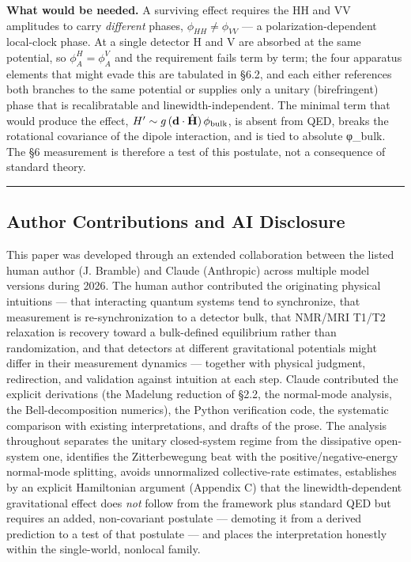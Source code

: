 \documentclass[
]{article}
\begin{document}
\textbf{What would be needed.} A surviving effect requires the HH and VV
amplitudes to carry \emph{different} phases, \(\phi_{HH}\neq\phi_{VV}\)
--- a polarization-dependent local-clock phase. At a single detector H
and V are absorbed at the same potential, so \(\phi_A^H=\phi_A^V\) and
the requirement fails term by term; the four apparatus elements that
might evade this are tabulated in §6.2, and each either references both
branches to the same potential or supplies only a unitary (birefringent)
phase that is recalibratable and linewidth-independent. The minimal term
that would produce the effect,
\(H' \sim g\,(\mathbf d\cdot\hat{\mathbf H})\,\phi_{\rm bulk}\), is
absent from QED, breaks the rotational covariance of the dipole
interaction, and is tied to absolute φ\_bulk. The §6 measurement is
therefore a test of this postulate, not a consequence of standard
theory.

\begin{center}\rule{0.5\linewidth}{0.5pt}\end{center}

\subsection{Author Contributions and AI
Disclosure}\label{author-contributions-and-ai-disclosure}

This paper was developed through an extended collaboration between the
listed human author (J. Bramble) and Claude (Anthropic) across multiple
model versions during 2026. The human author contributed the originating
physical intuitions --- that interacting quantum systems tend to
synchronize, that measurement is re-synchronization to a detector bulk,
that NMR/MRI T1/T2 relaxation is recovery toward a bulk-defined
equilibrium rather than randomization, and that detectors at different
gravitational potentials might differ in their measurement dynamics ---
together with physical judgment, redirection, and validation against
intuition at each step. Claude contributed the explicit derivations (the
Madelung reduction of §2.2, the normal-mode analysis, the
Bell-decomposition numerics), the Python verification code, the
systematic comparison with existing interpretations, and drafts of the
prose. The analysis throughout separates the unitary closed-system
regime from the dissipative open-system one, identifies the
Zitterbewegung beat with the positive/negative-energy normal-mode
splitting, avoids unnormalized collective-rate estimates, establishes by
an explicit Hamiltonian argument (Appendix C) that the
linewidth-dependent gravitational effect does \emph{not} follow from the
framework plus standard QED but requires an added, non-covariant
postulate --- demoting it from a derived prediction to a test of that
postulate --- and places the interpretation honestly within the
single-world, nonlocal family.
\end{document}
